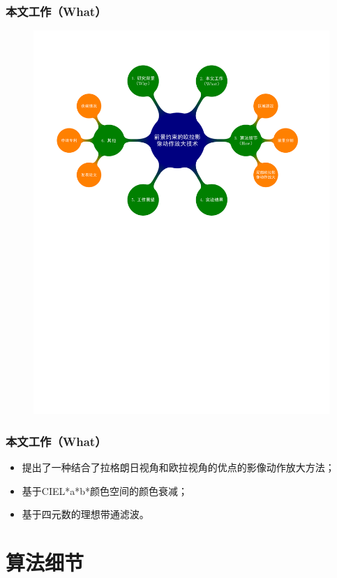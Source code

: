 \documentclass[xcolor=svgnames,serif,table]{beamer}
\begin{document}
\begin{frame}
  \frametitle{本文工作（What）}
  \vspace{-2.5em}
  \begin{figure}
    \centering
    \includegraphics[width=\textwidth, page=3]{mindmap.pdf}
  \end{figure}
\end{frame}

\begin{frame}
  \frametitle{本文工作（What）}
  \begin{itemize}[<+->]
  \item 提出了一种结合了拉格朗日视角和欧拉视角的优点的影像动作放大方法；
  \item 基于CIEL*a*b*颜色空间的颜色衰减；
  \item 基于四元数的理想带通滤波。
  \end{itemize}
\end{frame}

\section{算法细节}
\end{document}
